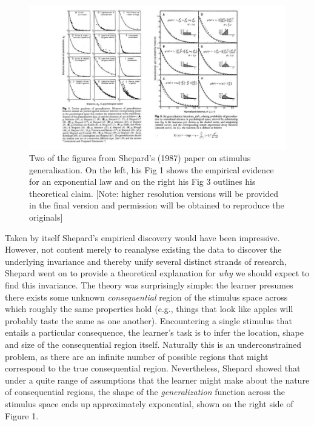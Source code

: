 \documentclass[english,doc]{apa6}
\begin{document}
\begin{figure}[t]
\includegraphics[width=6.4in]{shepard} \caption{Two of the figures from Shepard's (1987) paper on stimulus generalisation. On the left, his Fig 1 shows the empirical evidence for an exponential law and on the right his Fig 3 outlines his theoretical claim. {[}Note: higher resolution versions will be provided in the final version and permission will be obtained to reproduce the originals{]}}\label{fig:unnamed-chunk-1}
\end{figure}

Taken by itself Shepard's empirical discovery would have been impressive. However, not content merely to reanalyse existing the data to discover the underlying invariance and thereby unify several distinct strands of research, Shepard went on to provide a theoretical explanation for \emph{why} we should expect to find this invariance. The theory was surprisingly simple: the learner presumes there exists some unknown \emph{consequential} region of the stimulus space across which roughly the same properties hold (e.g., things that look like apples will probably taste the same as one another). Encountering a single stimulus that entails a particular consequence, the learner's task is to infer the location, shape and size of the consequential region itself. Naturally this is an underconstrained problem, as there are an infinite number of possible regions that might correspond to the true consequential region. Nevertheless, Shepard showed that under a quite range of assumptions that the learner might make about the nature of consequential regions, the shape of the \emph{generalization} function across the stimulus space ends up approximately exponential, shown on the right side of Figure 1.
\end{document}
